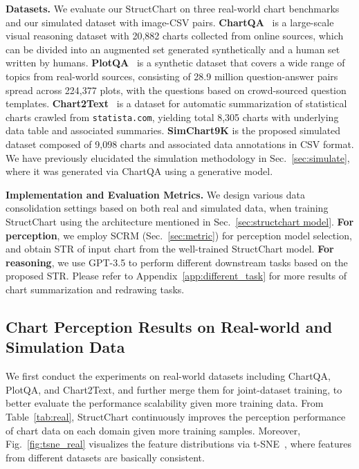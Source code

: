 \documentclass{article} \usepackage{iclr2024_conference,times}
\begin{document}
{\noindent\textbf{Datasets.} 
We evaluate our StructChart on three real-world chart benchmarks and our simulated dataset with image-CSV pairs. \textbf{ChartQA}~\citep{Masry2022ChartQAAB} is a large-scale visual reasoning dataset with 20,882 charts collected from online sources, which can be divided into an augmented set generated synthetically and a human set written by humans. \textbf{PlotQA}~\citep{Methani2019PlotQARO} is a synthetic dataset that covers a wide range of topics from real-world sources, consisting of 28.9 million question-answer pairs spread across 224,377 plots, with the questions based on crowd-sourced question templates. \textbf{Chart2Text}~\citep{Obeid2020CharttoTextGN} is a dataset for automatic summarization of statistical charts crawled from \texttt{statista.com}, yielding total 8,305 charts with underlying data table and associated summaries. \textbf{SimChart9K} is the proposed simulated dataset composed of 9,098 charts and associated data annotations in CSV format. We have previously elucidated the simulation methodology in Sec.~\ref{sec:simulate}, where it was generated via ChartQA using a generative model.

\noindent\textbf{Implementation and Evaluation Metrics.} 
We design various data consolidation settings based on both real and simulated data, when training StructChart using the architecture mentioned in Sec.~\ref{sec:structchart model}. \textbf{For perception}, we employ SCRM (Sec.~\ref{sec:metric}) for perception model selection, and obtain STR of input chart from the well-trained StructChart model. \textbf{For reasoning}, we use GPT-3.5 to perform different downstream tasks based on the proposed STR. Please refer to Appendix~\ref{app:different_task} for more results of chart summarization and redrawing tasks.

\vspace{-8pt}
\subsection{Chart Perception Results on Real-world and Simulation Data}
\vspace{-8pt}
We first conduct the experiments on real-world datasets including ChartQA, PlotQA, and Chart2Text, and further merge them for joint-dataset training, to better evaluate the performance scalability given more training data. From Table~\ref{tab:real}, StructChart continuously improves the perception performance of chart data on each domain given more training samples. Moreover, Fig.~\ref{fig:tsne_real} visualizes the feature distributions via t-SNE~\citep{van2008visualizing}, where features from different datasets are basically consistent.


}
\end{document}
